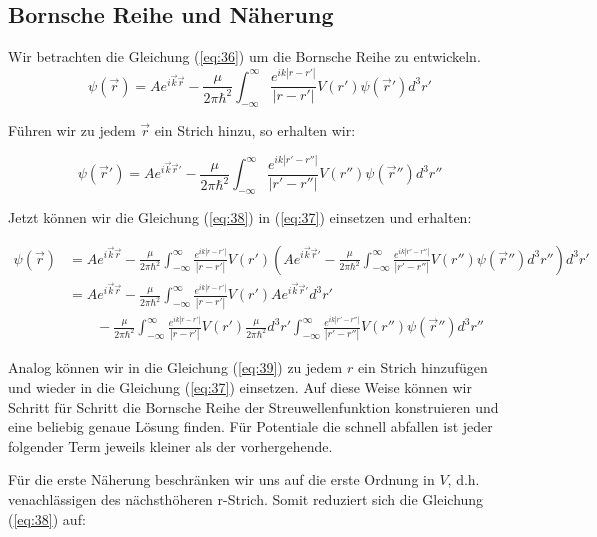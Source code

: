 \subsection{Bornsche Reihe und Näherung}

Wir betrachten die Gleichung (\ref{eq:36}) um die Bornsche Reihe zu entwickeln. 
\begin{equation}
  \label{eq:37}
  \psi(\vec r) =  Ae^{i\vec k \vec r}  -\frac{\mu}{2\pi\hbar^2} \int_{-\infty}^\infty \frac{ e^{ik |r-r'| }}{|r-r'|  }  V(r')\psi(\vec r') d^3 r'
\end{equation}

Führen wir zu jedem \(\vec r\) ein Strich hinzu, so erhalten wir:

\begin{equation}
  \label{eq:38}
  \psi(\vec r') =  Ae^{i\vec k \vec r'}  -\frac{\mu}{2\pi\hbar^2} \int_{-\infty}^\infty \frac{ e^{ik |r'-r''| }}{|r'-r''|  }  V(r'')\psi(\vec r'') d^3 r''
\end{equation}

Jetzt können wir die Gleichung (\ref{eq:38}) in (\ref{eq:37}) einsetzen und erhalten:

\begin{align}
  \label{eq:39}
   \psi(\vec r) &=  Ae^{i\vec k \vec r}  -\frac{\mu}{2\pi\hbar^2} \int_{-\infty}^\infty \frac{ e^{ik |r-r'| }}{|r-r'|  }  V(r')\left(  Ae^{i\vec k \vec r'}  -\frac{\mu}{2\pi\hbar^2} \int_{-\infty}^\infty \frac{ e^{ik |r'-r''| }}{|r'-r''|  }  V(r'')\psi(\vec r'') d^3 r''  \right)  d^3 r'\\
&=  Ae^{i\vec k \vec r}  -\frac{\mu}{2\pi\hbar^2} \int_{-\infty}^\infty \frac{ e^{ik |r-r'| }}{|r-r'|  }  V(r') Ae^{i\vec k \vec r'}d^3 r' \\
&\qquad -  \frac{\mu}{2\pi\hbar^2} \int_{-\infty}^\infty \frac{ e^{ik |r-r'| }}{|r-r'|  }  V(r')   \frac{\mu}{2\pi\hbar^2} d^3 r' \int_{-\infty}^\infty \frac{ e^{ik |r'-r''| }}{|r'-r''|  }  V(r'')\psi(\vec r'') d^3 r''
\end{align}


Analog können wir in die Gleichung (\ref{eq:39}) zu jedem \(r\) ein Strich hinzufügen und wieder in die Gleichung (\ref{eq:37}) einsetzen. Auf diese Weise können wir Schritt für Schritt die Bornsche Reihe der Streuwellenfunktion konstruieren und eine beliebig genaue Lösung finden. Für Potentiale die schnell abfallen ist jeder folgender Term jeweils kleiner als der vorhergehende.

Für die erste Näherung beschränken wir uns auf die erste Ordnung in \(V\), d.h. venachlässigen des nächsthöheren r-Strich. Somit reduziert sich die Gleichung (\ref{eq:38}) auf:

